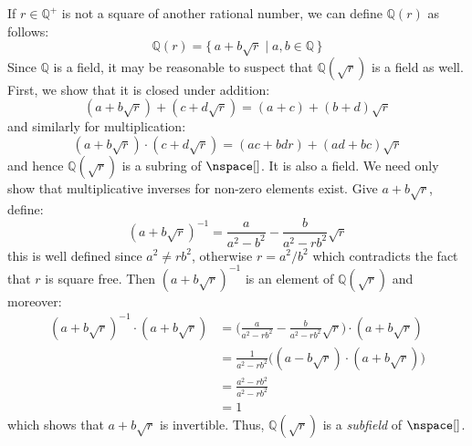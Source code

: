     \begin{example}
        If $r\in\mathbb{Q}^{+}$ is not a square of another rational number,
        we can define $\mathbb{Q}(r)$ as follows:
        \begin{equation}
            \mathbb{Q}(r)=\{\,a+b\sqrt{r}\;|\;a,b\in\mathbb{Q}\,\}
        \end{equation}
        Since $\mathbb{Q}$ is a field, it may be reasonable to suspect that
        $\mathbb{Q}(\sqrt{r})$ is a field as well. First, we show that it is
        closed under addition:
        \begin{equation}
            (a+b\sqrt{r})+(c+d\sqrt{r})=(a+c)+(b+d)\sqrt{r}
        \end{equation}
        and similarly for multiplication:
        \begin{equation}
            (a+b\sqrt{r})\cdot(c+d\sqrt{r})=(ac+bdr)+(ad+bc)\sqrt{r}
        \end{equation}
        and hence $\mathbb{Q}(\sqrt{r})$ is a subring of $\nspace[]$. It is
        also a field. We need only show that multiplicative inverses for
        non-zero elements exist. Give $a+b\sqrt{r}$, define:
        \begin{equation}
            (a+b\sqrt{r})^{\minus{1}}=\frac{a}{a^{2}-b^{2}}-
                \frac{b}{a^{2}-rb^{2}}\sqrt{r}
        \end{equation}
        this is well defined since $a^{2}\ne{r}b^{2}$, otherwise
        $r=a^{2}/b^{2}$ which contradicts the fact that $r$ is square free.
        Then $(a+b\sqrt{r})^{\minus{1}}$ is an element of
        $\mathbb{Q}(\sqrt{r})$ and moreover:
        \begin{subequations}
            \begin{align}
                (a+b\sqrt{r})^{\minus{1}}\cdot(a+b\sqrt{r})
                &=\Big(\frac{a}{a^{2}-rb^{2}}-
                    \frac{b}{a^{2}-rb^{2}}\sqrt{r}\Big)\cdot(a+b\sqrt{r})\\
                &=\frac{1}{a^{2}-rb^{2}}\big(
                    (a-b\sqrt{r})\cdot(a+b\sqrt{r})\big)\\
                &=\frac{a^{2}-rb^{2}}{a^{2}-rb^{2}}\\
                &=1
            \end{align}
        \end{subequations}
        which shows that $a+b\sqrt{r}$ is invertible. Thus,
        $\mathbb{Q}(\sqrt{r})$ is a \textit{subfield} of $\nspace[]$.
    \end{example}
